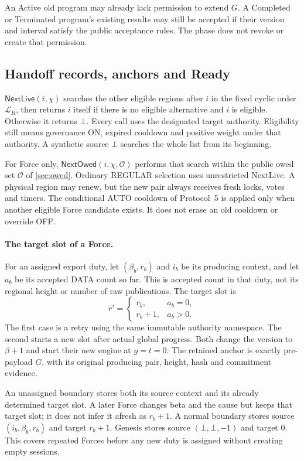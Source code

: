\documentclass[11pt,a4paper]{article}
\newcommand{\tagg}[1]{\ensuremath{\mathsf{#1}}}
\begin{document}
An Active old program may already lack permission to extend $G$.
A Completed or Terminated program's existing results may still be
accepted if their version and interval satisfy the public acceptance
rules. The phase does not revoke or create that permission.

\subsection{Handoff records, anchors and Ready}
\label{sec:witness}
$\tagg{NextLive}(i,\chi)$ searches the other eligible regions after $i$
in the fixed cyclic order $\mathcal L_R$, then returns $i$ itself if
there is no eligible alternative and $i$ is eligible. Otherwise it
returns $\bot$. Every call uses the designated target authority.
Eligibility still means governance ON, expired cooldown and positive
weight under that authority. A synthetic source $\bot$ searches the
whole list from its beginning.

For Force only, $\tagg{NextOwed}(i,\chi,\mathcal O)$ performs that search
within the public owed set $\mathcal O$ of \cref{sec:owed}. Ordinary
REGULAR selection uses unrestricted NextLive. A physical region may
renew, but the new pair always receives fresh locks, votes and timers.
The conditional AUTO cooldown of Protocol~5 is applied only when another
eligible Force candidate exists. It does not erase an old cooldown or
override OFF.

\paragraph{The target slot of a Force.}
\label{sec:retry-slot}
For an assigned export duty, let $(\beta_b,r_b)$ and $i_b$ be its
producing context, and let $a_b$ be its accepted DATA count so far.
This is accepted count in that duty, not its regional height or number
of raw publications. The target slot is
\[
 r'=
 \begin{cases}
 r_b,&a_b=0,\\
 r_b+1,&a_b>0.
 \end{cases}
\]
The first case is a retry using the same immutable authority namespace.
The second starts a new slot after actual global progress. Both change
the version to $\beta+1$ and start their new engine at $g=t=0$.
The retained anchor is exactly pre-payload $G$, with its original
producing pair, height, hash and commitment evidence.

An unassigned boundary stores both its source context and its already
determined target slot. A later Force changes beta and the cause but
keeps that target slot; it does not infer it afresh as $r_b+1$.
A normal boundary stores source $(i_b,\beta_b,r_b)$ and target $r_b+1$.
Genesis stores source $(\bot,\bot,-1)$ and target 0. This covers repeated
Forces before any new duty is assigned without creating empty sessions.
\end{document}
